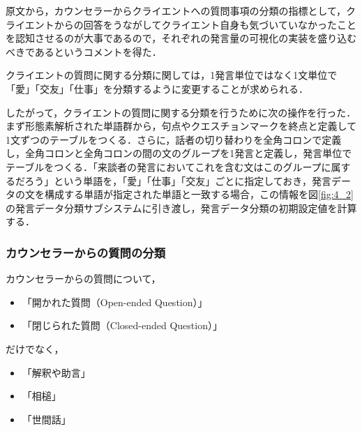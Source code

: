 \documentclass[shuuron]{kuee}
\begin{document}
原文から，カウンセラーからクライエントへの質問事項の分類の指標として，クライエントからの回答をうながしてクライエント自身も気づいていなかったことを認知させるのが大事であるので，それぞれの発言量の可視化の実装を盛り込むべきであるというコメントを得た．

クライエントの質問に関する分類に関しては，1発言単位ではなく1文単位で「愛」「交友」「仕事」を分類するように変更することが求められる．


したがって，クライエントの質問に関する分類を行うために次の操作を行った．まず形態素解析された単語群から，句点やクエスチョンマークを終点と定義して1文ずつのテーブルをつくる．さらに，話者の切り替わりを全角コロンで定義し，全角コロンと全角コロンの間の文のグループを1発言と定義し，発言単位でテーブルをつくる．「来談者の発言においてこれを含む文はこのグループに属するだろう」という単語を，「愛」「仕事」「交友」ごとに指定しておき，発言データの文を構成する単語が指定された単語と一致する場合，この情報を図\ref{fig:4_2}の発言データ分類サブシステムに引き渡し，発言データ分類の初期設定値を計算する．

\subsubsection{カウンセラーからの質問の分類}



カウンセラーからの質問について，
\begin{itemize}
  \item 「開かれた質問（Open-ended Question）」
  \item 「閉じられた質問（Closed-ended Question）」

\end{itemize}
だけでなく，
\begin{itemize}
  \item 「解釈や助言」
  \item 「相槌」
  \item 「世間話」
\end{itemize}
\end{document}
